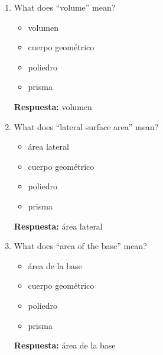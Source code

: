 \documentclass[11pt,a4paper]{article}
\begin{document}
\begin{enumerate}
\begin{itemize}
\item prisma
\end{itemize}
\textbf{Respuesta:} área
\item What does ``volume'' mean?
\begin{itemize}
\item volumen
\item cuerpo geométrico
\item poliedro
\item prisma
\end{itemize}
\textbf{Respuesta:} volumen
\item What does ``lateral surface area'' mean?
\begin{itemize}
\item área lateral
\item cuerpo geométrico
\item poliedro
\item prisma
\end{itemize}
\textbf{Respuesta:} área lateral
\item What does ``area of the base'' mean?
\begin{itemize}
\item área de la base
\item cuerpo geométrico
\item poliedro
\item prisma
\end{itemize}
\textbf{Respuesta:} área de la base
\end{enumerate}
\end{document}
